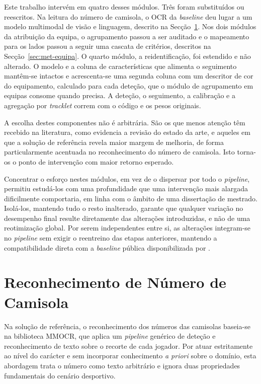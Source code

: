 Este trabalho intervém em quatro desses módulos. Três foram substituídos ou reescritos. Na leitura do número de camisola, o OCR da \emph{baseline} deu lugar a um modelo multimodal de visão e linguagem, descrito na Secção~\ref{sec:met-jnr}. Nos dois módulos da atribuição da equipa, o agrupamento passou a ser auditado e o mapeamento para os lados passou a seguir uma cascata de critérios, descritos na Secção~\ref{sec:met-equipa}. O quarto módulo, a reidentificação, foi estendido e não alterado. O modelo e a coluna de características que alimenta o seguimento mantêm-se intactos e acrescenta-se uma segunda coluna com um descritor de cor do equipamento, calculado para cada deteção, que o módulo de agrupamento em equipas consome quando precisa. A deteção, o seguimento, a calibração e a agregação por \emph{tracklet} correm com o código e os pesos originais.

A escolha destes componentes não é arbitrária. São os que menos atenção têm recebido na literatura, como evidencia a revisão do estado da arte, e aqueles em que a solução de referência revela maior margem de melhoria, de forma particularmente acentuada no reconhecimento do número de camisola. Isto torna-os o ponto de intervenção com maior retorno esperado.

Concentrar o esforço nestes módulos, em vez de o dispersar por todo o \emph{pipeline}, permitiu estudá-los com uma profundidade que uma intervenção mais alargada dificilmente comportaria, em linha com o âmbito de uma dissertação de mestrado. Isolá-los, mantendo tudo o resto inalterado, garante que qualquer variação no desempenho final resulte diretamente das alterações introduzidas, e não de uma reotimização global. Por serem independentes entre si, as alterações integram-se no \emph{pipeline} sem exigir o reentreino das etapas anteriores, mantendo a compatibilidade direta com a \emph{baseline} pública disponibilizada por \citet{somers2024soccernet}.

\section{Reconhecimento de Número de Camisola}\label{sec:met-jnr}

Na solução de referência, o reconhecimento dos números das camisolas baseia-se na biblioteca MMOCR, que aplica um \emph{pipeline} genérico de deteção e reconhecimento de texto sobre o recorte de cada jogador. Por atuar estritamente ao nível do carácter e sem incorporar conhecimento \emph{a priori} sobre o domínio, esta abordagem trata o número como texto arbitrário e ignora duas propriedades fundamentais do cenário desportivo.


